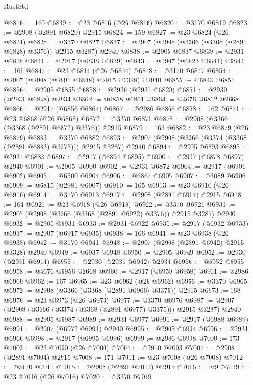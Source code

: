 \begin{lexlean}{RustStd}
\begin{coremodule}
@6816 := 160
@6819 := @23 @6816 (@26 @6816)
@6820 := @3170 @6819
@6823 := @2908 (@2891 @6820) @2915
@6824 := 159
@6827 := @23 @6824 (@26 @6824)
@6828 := @3370 @6827
@6837 := @2907 (@2908 (@3366 (@3368 (@2891 @6828) @3376)) @2915 @3287) @2940
@6838 := @2905 @6837
@6839 := @2931 @6828
@6841 := @2917 (@6838 @6839)
@6843 := @2907 (@6823 @6841)
@6844 := 161
@6847 := @23 @6844 (@26 @6844)
@6848 := @3170 @6847
@6854 := @2907 (@2908 (@2891 @6848) @2915 @3328) @2940
@6855 := @6843 @6854
@6856 := @2905 @6855
@6858 := @2930 (@2931 @6820)
@6861 := @2930 (@2931 @6848) @2934
@6862 := @6858 @6861
@6864 := @4676 @6862 @2668
@6866 := @2917 (@6856 @6864)
@6867 := @2986 @6866
@6868 := 162
@6871 := @23 @6868 (@26 @6868)
@6872 := @3370 @6871
@6878 := @2908 (@3366 (@3368 (@2891 @6872) @3376)) @2915
@6879 := 163
@6882 := @23 @6879 (@26 @6879)
@6883 := @3370 @6882
@6893 := @2907 (@2908 (@3366 (@3374 (@3368 (@2891 @6883) @3375))) @2915 @3287) @2940
@6894 := @2905 @6893
@6895 := @2931 @6883
@6897 := @2917 (@6894 @6895)
@6900 := @2907 (@6878 @6897) @2940
@6901 := @2905 @6900
@6902 := @2931 @6872
@6904 := @2917 (@6901 @6902)
@6905 := @6500 @6904
@6906 := @6867 @6905
@6907 := @3089 @6906
@6909 := @6815 (@2981 @6907)
@6910 := 165
@6913 := @23 @6910 (@26 @6910)
@6914 := @3170 @6913
@6917 := @2908 (@2891 @6914) @2915
@6918 := 164
@6921 := @23 @6918 (@26 @6918)
@6922 := @3370 @6921
@6931 := @2907 (@2908 (@3366 (@3368 (@2891 @6922) @3376)) @2915 @3287) @2940
@6932 := @2905 @6931
@6933 := @2931 @6922
@6935 := @2917 (@6932 @6933)
@6937 := @2907 (@6917 @6935)
@6938 := 166
@6941 := @23 @6938 (@26 @6938)
@6942 := @3170 @6941
@6948 := @2907 (@2908 (@2891 @6942) @2915 @3328) @2940
@6949 := @6937 @6948
@6950 := @2905 @6949
@6952 := @2930 (@2931 @6914)
@6955 := @2930 (@2931 @6942) @2934
@6956 := @6952 @6955
@6958 := @4676 @6956 @2668
@6960 := @2917 (@6950 @6958)
@6961 := @2986 @6960
@6962 := 167
@6965 := @23 @6962 (@26 @6962)
@6966 := @3370 @6965
@6972 := @2908 (@3366 (@3368 (@2891 @6966) @3376)) @2915
@6973 := 168
@6976 := @23 @6973 (@26 @6973)
@6977 := @3370 @6976
@6987 := @2907 (@2908 (@3366 (@3374 (@3368 (@2891 @6977) @3375))) @2915 @3287) @2940
@6988 := @2905 @6987
@6989 := @2931 @6977
@6991 := @2917 (@6988 @6989)
@6994 := @2907 (@6972 @6991) @2940
@6995 := @2905 @6994
@6996 := @2931 @6966
@6998 := @2917 (@6995 @6996)
@6999 := @2986 @6998
@7000 := 173
@7003 := @23 @7000 (@26 @7000)
@7004 := @2910 @7003
@7007 := @2908 (@2891 @7004) @2915
@7008 := 171
@7011 := @23 @7008 (@26 @7008)
@7012 := @3170 @7011
@7015 := @2908 (@2891 @7012) @2915
@7016 := 169
@7019 := @23 @7016 (@26 @7016)
@7020 := @3370 @7019

\end{coremodule}
\end{lexlean}
